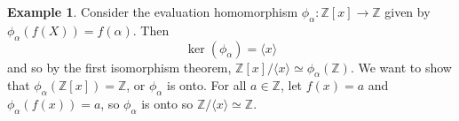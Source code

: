 \documentclass[11pt]{article}
\theoremstyle{definition}\newtheorem{definition}{Definition}
\theoremstyle{definition}\newtheorem{question}{Question}
\theoremstyle{definition}\newtheorem*{solution}{Solution}
\theoremstyle{definition}\newtheorem{example}{Example}
\theoremstyle{definition}\newtheorem{notation}{Notation}
\theoremstyle{theorem}\newtheorem{theorem}{Theorem}
\theoremstyle{theorem}\newtheorem{corollary}{Corollary}
\theoremstyle{theorem}\newtheorem{lemma}{Lemma}
\theoremstyle{theorem}\newtheorem{proposition}{Proposition}
\newcommand{\Z}{\mathbb{Z}}
\begin{document}
\begin{center}
\end{center}

\begin{example}
    Consider the evaluation homomorphism $\phi_{\alpha} : \Z[x] \to \Z$ given by $\phi_{\alpha}(f(X)) = f(\alpha)$. Then
    \begin{equation*}
        \ker(\phi_{\alpha}) = \langle{x}\rangle
    \end{equation*}
    and so by the first isomorphism theorem, $\Z[x]/\langle{x}\rangle \simeq \phi_{\alpha}(\Z)$. We want to show that $\phi_{\alpha}(\Z[x]) = \Z$, or $\phi_{\alpha}$ is onto. For all $a \in \Z$, let $f(x) = a$ and $\phi_{\alpha}(f(x)) = a$, so $\phi_{\alpha}$ is onto so $\Z/\langle{x}\rangle \simeq \Z$.
\end{example}
\end{document}
